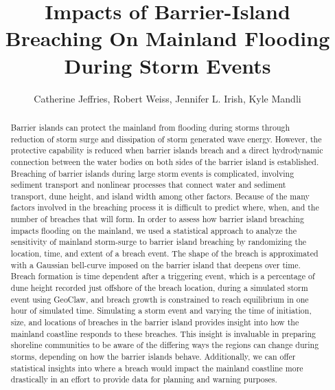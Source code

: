 \documentclass{coastal_paper}
\title{Impacts of Barrier-Island Breaching On Mainland Flooding During Storm Events}
\author{Catherine Jeffries, Robert Weiss, Jennifer L. Irish, Kyle Mandli}
\begin{document}
\maketitle
\begin{abstract}
Barrier islands can protect the mainland from flooding during storms through reduction of storm surge and dissipation of storm generated wave energy. However, the protective capability is reduced when barrier islands breach and a direct hydrodynamic connection between the water bodies on both sides of the barrier island is established. Breaching of barrier islands during large storm events is complicated, involving sediment transport and nonlinear processes that connect water and sediment transport, dune height, and island width among other factors. Because of the many factors involved in the breaching process it is difficult to predict where, when, and the number of breaches that will form. In order to assess how barrier island breaching impacts flooding on the mainland, we used a statistical approach to analyze the sensitivity of mainland storm-surge to barrier island breaching by randomizing the location, time, and extent of a breach event. The shape of the breach is approximated with a Gaussian bell-curve imposed on the barrier island that deepens over time. Breach formation is time dependent after a triggering event, which is a percentage of dune height recorded just offshore of the breach location, during a simulated storm event using GeoClaw, and breach growth is constrained to reach equilibrium in one hour of simulated time. Simulating a storm event and varying the time of initiation, size, and locations of breaches in the barrier island provides insight into how the mainland coastline responds to these breaches. This insight is invaluable in preparing shoreline communities to be aware of the differing ways the regions can change during storms, depending on how the barrier islands behave. Additionally, we can offer statistical insights into where a breach would impact the mainland coastline more drastically in an effort to provide data for planning and warning purposes.    
\end{abstract}
\newpage

\linenumbers
\end{document}
